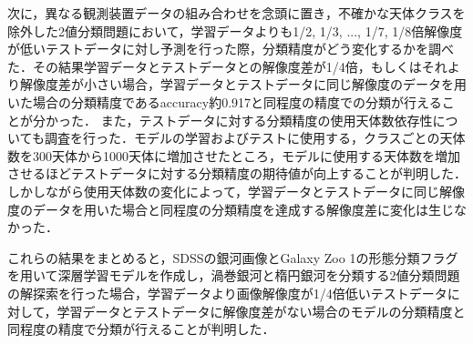 \documentclass[a4j, 11pt]{jreport}
\begin{document}
次に，異なる観測装置データの組み合わせを念頭に置き，不確かな天体クラスを除外した2値分類問題において，学習データよりも1/2, 1/3, ..., 1/7, 1/8倍解像度が低いテストデータに対し予測を行った際，分類精度がどう変化するかを調べた．その結果学習データとテストデータとの解像度差が1/4倍，もしくはそれより解像度差が小さい場合，学習データとテストデータに同じ解像度のデータを用いた場合の分類精度であるaccuracy約0.917と同程度の精度での分類が行えることが分かった．
また，テストデータに対する分類精度の使用天体数依存性についても調査を行った．モデルの学習およびテストに使用する，クラスごとの天体数を300天体から1000天体に増加させたところ，モデルに使用する天体数を増加させるほどテストデータに対する分類精度の期待値が向上することが判明した．
しかしながら使用天体数の変化によって，学習データとテストデータに同じ解像度のデータを用いた場合と同程度の分類精度を達成する解像度差に変化は生じなかった．

これらの結果をまとめると，SDSSの銀河画像とGalaxy Zoo 1の形態分類フラグを用いて深層学習モデルを作成し，渦巻銀河と楕円銀河を分類する2値分類問題の解探索を行った場合，学習データより画像解像度が1/4倍低いテストデータに対して，学習データとテストデータに解像度差がない場合のモデルの分類精度と同程度の精度で分類が行えることが判明した．





\end{document}
